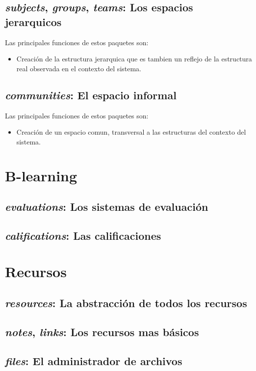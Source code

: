 \subsection{\emph{subjects}, \emph{groups}, \emph{teams}: Los espacios
jerarquicos}
Las principales funciones de estos paquetes son:
\begin{itemize}
\item Creación de la estructura jerarquica que es tambien un reflejo de la
estructura real observada en el contexto del sistema.
\end{itemize}

\subsection{\emph{communities}: El espacio informal}
Las principales funciones de estos paquetes son:
\begin{itemize}
\item Creación de un espacio comun, transversal a las estructuras del contexto
del sistema.
\end{itemize}

\section{B-learning}
\subsection{\emph{evaluations}: Los sistemas de evaluación}
\subsection{\emph{califications}: Las calificaciones}

\section{Recursos}
\subsection{\emph{resources}: La abstracción de todos los recursos}
\subsection{\emph{notes}, \emph{links}: Los recursos mas básicos}
\subsection{\emph{files}: El administrador de archivos}
